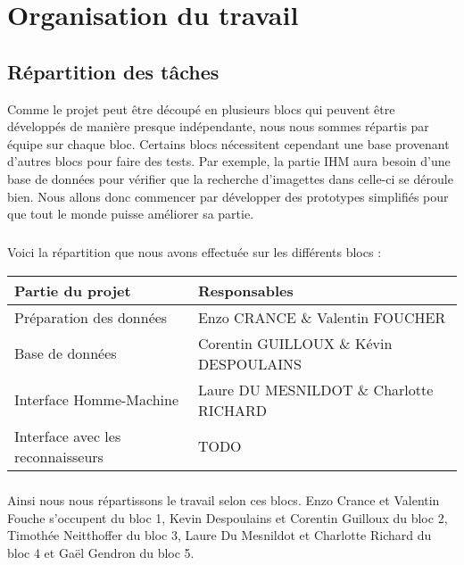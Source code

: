 \chapter{Organisation du travail}

\section{Répartition des tâches}

Comme le projet peut être découpé en plusieurs blocs qui peuvent être
développés de manière presque indépendante, nous nous sommes répartis
par équipe sur chaque bloc. Certains blocs nécessitent
cependant une base provenant d’autres blocs pour faire des tests.
Par exemple, la partie IHM aura besoin d’une base de données pour
vérifier que la recherche d’imagettes dans celle-ci se déroule bien.
Nous allons donc commencer par développer des prototypes simplifiés
pour que tout le monde puisse améliorer sa partie.

\paragraph{}
Voici la répartition que nous avons effectuée sur les différents blocs :

\begin{center}
\begin{tabular}{ | l | l | }
\hline
{\textbf{Partie du projet}}             &   {\textbf{Responsables}} \\ \hline
{Préparation des données}               &   {Enzo CRANCE \& Valentin FOUCHER} \\ \hline
{Base de données}                       &   {Corentin GUILLOUX \& Kévin DESPOULAINS} \\ \hline
{Interface Homme-Machine}               &   {Laure DU MESNILDOT \& Charlotte RICHARD} \\ \hline
{Interface avec les reconnaisseurs}     &   {TODO} \\ \hline
\end{tabular}
\end{center}

\paragraph{}

Ainsi nous nous répartissons le travail selon ces blocs.
Enzo Crance et Valentin Fouche s’occupent du bloc 1, Kevin Despoulains et Corentin Guilloux du bloc 2, Timothée Neitthoffer du bloc 3, Laure Du Mesnildot et Charlotte Richard du bloc 4 et Gaël Gendron du bloc 5. 

